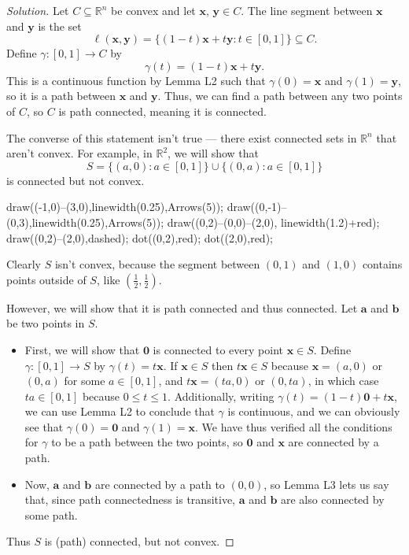 \documentclass[11pt]{scrartcl}
\providecommand{\half}{\frac{1}{2}}
\providecommand{\RR}{\mathbb R}
\providecommand{\ii}{\item}
\providecommand{\mb}[1]{\mathbf{#1}}
\newenvironment{soln}{\begin{proof}[Solution]}{\end{proof}}
\begin{document}
\begin{soln}
	Let $C\subseteq \RR^n$ be convex and let $\mb x,\,\mb y\in C$.
	The line segment between $\mb x$ and $\mb y$ is the set
	\[\ell(\mb x, \mb y) = \{(1 - t)\mb x + t\mb y : t\in[0, 1]\}\subseteq C.\]
	Define $\gamma\colon[0, 1]\to C$ by
	\[\gamma(t) = (1 - t)\mb x + t\mb y.\]
	This is a continuous function by Lemma L2 such that
	$\gamma(0) = \mb x$ and $\gamma(1) = \mb y$,
	so it is a path between $\mb x$ and $\mb y$.
	Thus, we can find a path between any two points of $C$,
	so $C$ is path connected, meaning it is connected.
	
	The converse of this statement isn't true ---
	there exist connected sets in $\RR^n$ that aren't convex.
	For example, in $\RR^2$, we will show that
	\[S = \{(a, 0) : a\in[0, 1]\}\cup \{(0, a) : a\in[0, 1]\}\]
	is connected but not convex.
	\begin{center}
		\begin{asy}
			draw((-1,0)--(3,0),linewidth(0.25),Arrows(5));
			draw((0,-1)--(0,3),linewidth(0.25),Arrows(5));
			draw((0,2)--(0,0)--(2,0), linewidth(1.2)+red);
			draw((0,2)--(2,0),dashed);
			dot((0,2),red);
			dot((2,0),red);
		\end{asy}
	\end{center}

	Clearly $S$ isn't convex, because the segment between $(0,1)$
	and $(1,0)$ contains points outside of $S$, like $(\half,\half)$.
	
	However, we will show that it is path connected and thus connected.
	Let $\mb a$ and $\mb b$ be two points in $S$.
	\begin{itemize}
		\ii First, we will show that
		$\mb 0$ is connected to every point $\mb x\in S$.
		Define $\gamma\colon[0,1]\to S$ by $\gamma(t) = t\mb x$.
		If $\mb x\in S$ then $t\mb x\in S$ because
		$\mb x = (a, 0)$ or $(0, a)$ for some $a\in[0, 1]$,
		and $t\mb x = (ta, 0)$ or $(0, ta)$, in which case
		$ta\in[0, 1]$ because $0\le t\le1$.
		Additionally, writing $\gamma(t) = (1-t)\mb 0 + t\mb x$,
		we can use Lemma L2 to conclude that $\gamma$ is continuous,
		and we can obviously see that $\gamma(0) = \mb 0$ and
		$\gamma(1) = \mb x$.
		We have thus verified all the conditions for $\gamma$
		to be a path between the two points,
		so $\mb 0$ and $\mb x$ are connected by a path.
		
		\ii Now, $\mb a$ and $\mb b$ are connected by a path to $(0,0)$,
		so Lemma L3 lets us say that, since
		path connectedness is transitive, $\mb a$ and $\mb b$
		are also connected by some path.
	\end{itemize}
	Thus $S$ is (path) connected, but not convex.
\end{soln}
\end{document}
